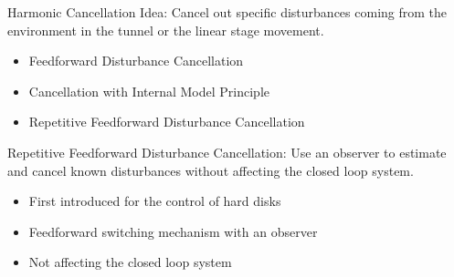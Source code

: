 \documentclass[10pt]{beamer}
\begin{document}
\begin{frame}{Harmonic Cancellation}
  \alert{Idea}: Cancel out specific disturbances coming from the environment in the tunnel or the linear stage movement.
  \begin{itemize}
    \item Feedforward Disturbance Cancellation
    \item Cancellation with Internal Model Principle
    \item Repetitive Feedforward Disturbance Cancellation
  \end{itemize}
  \alert{Repetitive Feedforward Disturbance Cancellation}: Use an observer to estimate and cancel known disturbances without affecting the closed loop system.
  \begin{itemize}
    \item First introduced for the control of hard disks
    \item Feedforward switching mechanism with an observer
    \item Not affecting the closed loop system
  \end{itemize}
\end{frame}
\end{document}
